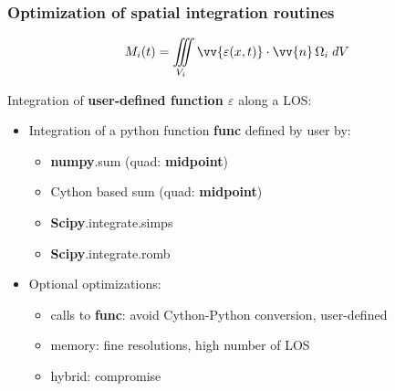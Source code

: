 \documentclass[10pt]{beamer}
\begin{document}
\begin{frame}
\frametitle{Optimization of spatial integration routines}

    $$M_i(t) = \iiint\limits_{V_i} \vv{\varepsilon(x,t)}\cdot\vv{n} \,\Omega_i \;{d}V$$

Integration of \textbf{user-defined function $\varepsilon$} along a LOS:
	\begin{itemize}
	\item Integration of a python function \textbf{func} defined by user by:
		\begin{itemize}
		\item \textbf{numpy}.sum (quad: \textbf{midpoint})
		\item Cython based sum (quad: \textbf{midpoint})
		\item \textbf{Scipy}.integrate.simps
		\item \textbf{Scipy}.integrate.romb
		\end{itemize}
	\item Optional optimizations:
		\begin{itemize}
		\item calls to \textbf{func}: avoid Cython-Python conversion, user-defined
		\item memory: fine resolutions, high number of LOS
		\item hybrid: compromise
		\end{itemize}
	\end{itemize}

\end{frame}


%
%
%
%
%
\end{document}
